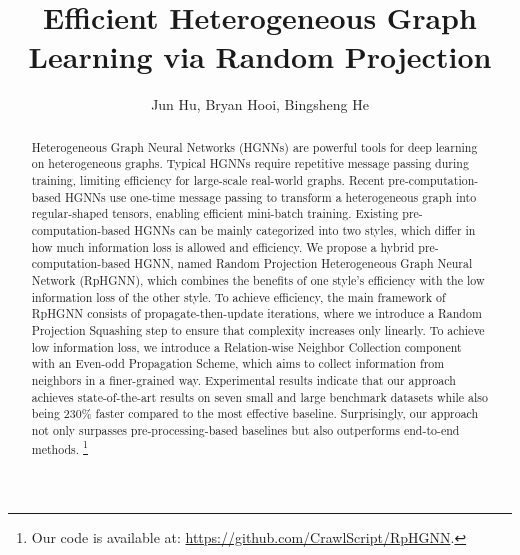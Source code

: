 \documentclass[lettersize,journal]{IEEEtran}
\begin{document}
\title{Efficient Heterogeneous Graph Learning via Random Projection}



\author{Jun Hu, Bryan Hooi, Bingsheng He}








\maketitle

\begin{abstract}



Heterogeneous Graph Neural Networks (HGNNs) are powerful tools for deep learning on heterogeneous graphs.
Typical HGNNs require repetitive message passing during training, limiting efficiency for large-scale real-world graphs.
Recent pre-computation-based HGNNs use one-time message passing to transform a heterogeneous graph into regular-shaped tensors, enabling efficient mini-batch training.
Existing pre-computation-based HGNNs can be mainly categorized into two styles, which differ in how much information loss is allowed and efficiency.
We propose a hybrid pre-computation-based HGNN, named Random Projection Heterogeneous Graph Neural Network (RpHGNN), which combines the benefits of one style's efficiency with the low information loss of the other style.
To achieve efficiency, the main framework of RpHGNN consists of propagate-then-update iterations, where we introduce a Random Projection Squashing step to ensure that complexity increases only linearly.
To achieve low information loss, we introduce a Relation-wise Neighbor Collection component with an Even-odd Propagation Scheme, which aims to collect information from neighbors in a finer-grained way. 
Experimental results indicate that our approach achieves state-of-the-art results on seven small and large benchmark datasets while also being 230\% faster compared to the most effective baseline.  
Surprisingly, our approach not only surpasses pre-processing-based baselines but also outperforms end-to-end methods.
\footnote{Our code is available at: \url{https://github.com/CrawlScript/RpHGNN}.}


\end{abstract}
\end{document}
